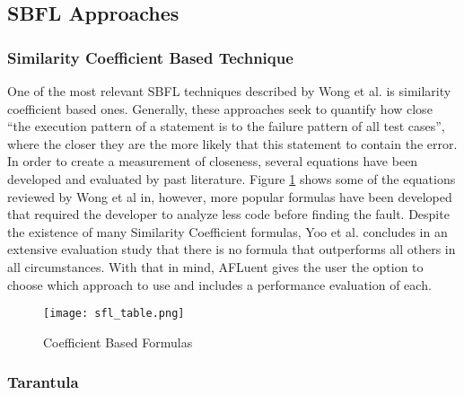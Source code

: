 \subsection{SBFL Approaches}
\label{subsec:sbfl}

\subsubsection{Similarity Coefficient Based Technique}
\label{subsubsec:coefficient_based}

One of the most relevant SBFL techniques described by Wong et al.
\cite{wong2016survey} is similarity coefficient based ones. Generally, these approaches
seek to quantify how close ``the execution pattern of a statement is to the
failure pattern of all test cases'', where the closer they are the more
likely that this statement to contain the error. In order to create a
measurement of closeness, several equations have been developed and evaluated by
past literature. Figure \ref{fig:sbfl_eq} shows some of the equations reviewed by
Wong et al in, however, more popular formulas have been developed that
required the developer to analyze less code before finding the fault. Despite
the existence of many Similarity Coefficient formulas, Yoo et al.
\cite{yoo2014no} concludes in an extensive evaluation study that there is no
formula that outperforms all others in all circumstances. With that in mind,
AFLuent gives the user the option to choose which approach to use and includes
a performance evaluation of each.

\begin{figure}[!htb]
	\begin{center}
		\texttt{[image: sfl\_table.png]}
		\caption{\label{fig:sbfl_eq} Coefficient Based Formulas \cite{wong2016survey}}
	\end{center}
\end{figure}

\subsubsection{Tarantula}
\label{subsubsec:tarantula_lit}

